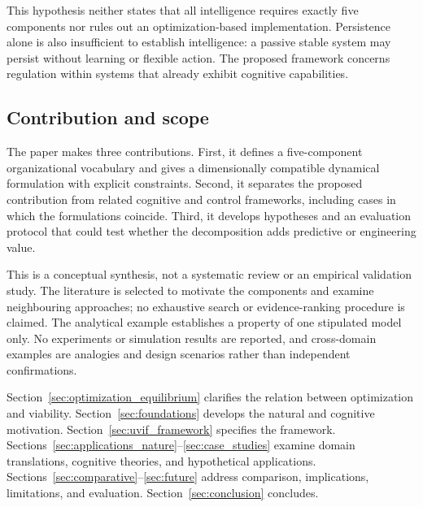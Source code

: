 This hypothesis neither states that all intelligence requires exactly five components nor rules out an optimization-based implementation. Persistence alone is also insufficient to establish intelligence: a passive stable system may persist without learning or flexible action. The proposed framework concerns regulation within systems that already exhibit cognitive capabilities.

\subsection{Contribution and scope}
The paper makes three contributions. First, it defines a five-component organizational vocabulary and gives a dimensionally compatible dynamical formulation with explicit constraints. Second, it separates the proposed contribution from related cognitive and control frameworks, including cases in which the formulations coincide. Third, it develops hypotheses and an evaluation protocol that could test whether the decomposition adds predictive or engineering value.

This is a conceptual synthesis, not a systematic review or an empirical validation study. The literature is selected to motivate the components and examine neighbouring approaches; no exhaustive search or evidence-ranking procedure is claimed. The analytical example establishes a property of one stipulated model only. No experiments or simulation results are reported, and cross-domain examples are analogies and design scenarios rather than independent confirmations.

Section~\ref{sec:optimization_equilibrium} clarifies the relation between optimization and viability. Section~\ref{sec:foundations} develops the natural and cognitive motivation. Section~\ref{sec:uvif_framework} specifies the framework. Sections~\ref{sec:applications_nature}--\ref{sec:case_studies} examine domain translations, cognitive theories, and hypothetical applications. Sections~\ref{sec:comparative}--\ref{sec:future} address comparison, implications, limitations, and evaluation. Section~\ref{sec:conclusion} concludes.
